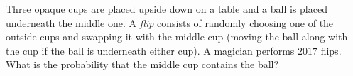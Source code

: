 Three opaque cups are placed upside down on a table and a ball is placed underneath the middle one. A \emph{flip} consists of randomly choosing one of the outside cups and swapping it with the middle cup (moving the ball along with the cup if the ball is underneath either cup). A magician performs $2017$ flips. What is the probability that the middle cup contains the ball?